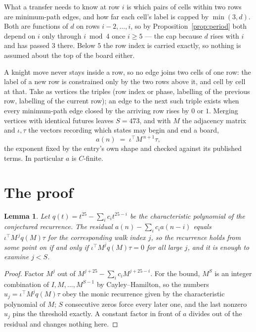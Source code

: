 \documentclass[11pt,a4paper]{article}
\theoremstyle{plain}
\newtheorem{lemma}[theorem]{Lemma}
\theoremstyle{definition}
\begin{document}
What a transfer needs to know at row $i$ is which pairs of cells within two rows are minimum-path edges, and how far each cell's label is capped by $\min(3,d)$. Both are functions of $d$ on rows $i-2,\dots,i$, so by Proposition~\ref{prop:period} both depend on $i$ only through $i\bmod 4$ once $i\ge5$ --- the cap because $d$ rises with $i$ and has passed $3$ there. Below $5$ the row index is carried exactly, so nothing is assumed about the top of the board either.

A knight move never stays inside a row, so no edge joins two cells of one row: the label of a new row is constrained only by the two rows above it, and cell by cell at that. Take as vertices the triples (row index or phase, labelling of the previous row, labelling of the current row); an edge to the next such triple exists when every minimum-path edge closed by the arriving row rises by $0$ or $1$. Merging vertices with identical futures leaves $S=473$, and with $M$ the adjacency matrix and $\iota,\tau$ the vectors recording which states may begin and end a board,
\[
a(n)\;=\;\iota^{\!\top}M^{\,n+1}\tau ,
\]
the exponent fixed by the entry's own shape and checked against its published terms. In
particular $a$ is $C$-finite.

\section{The proof}

\begin{lemma}\label{lem:crit}
Let $q(t)=t^{25}-\sum_i c_it^{25-i}$ be the characteristic polynomial of the
conjectured recurrence. The residual $a(n)-\sum_ic_ia(n-i)$ equals
$\iota^{\!\top}M^{\,j}q(M)\tau$ for the corresponding walk index $j$, so the recurrence
holds from some point on if and only if $\iota^{\!\top}M^{j}q(M)\tau=0$ for all large $j$,
and it is enough to examine $j<S$.
\end{lemma}

\begin{proof}
Factor $M^{j}$ out of $M^{j+25}-\sum_ic_iM^{j+25-i}$. For the bound, $M^{S}$
is an integer combination of $I,M,\dots,M^{S-1}$ by Cayley--Hamilton, so the numbers
$u_j=\iota^{\!\top}M^{j}q(M)\tau$ obey the monic recurrence given by the characteristic
polynomial of $M$; $S$ consecutive zeros force every later one, and the last nonzero $u_j$
pins the threshold exactly. A constant factor in front of $a$ divides out of the residual and
changes nothing here.
\end{proof}
\end{document}
